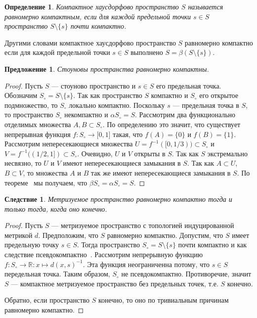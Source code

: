 \documentclass[12pt]{article}
\newtheorem{proposition}[theorem]{Предложение}
\newtheorem{corollary}[theorem]{Следствие}
\newtheorem{definition}[theorem]{Определение}
\begin{document}
\begin{definition} Компактное хаусдорфово пространство $S$ называется равномерно
    компактным, если для каждой предельной точки $s\in S$ пространство
    $S\setminus \{s\}$ почти компактно.
\end{definition}

Другими словами компактное хаусдорфово пространство $S$ равномерно компактно
если для каждой предельной точки $s\in S$ выполнено $S=\beta(S\setminus \{s\})$.

\begin{proposition}\label{StoneSpUnifComp} Стоуновы пространства равномерно
    компактны.
\end{proposition}
\begin{proof} Пусть $S$ --- стоуново пространство и $s\in S$ его предельная
    точка. Обозначим $S_\circ=S\setminus \{s\}$. Так как пространство $S$
    компактно и $S_\circ$ его открытое подмножество, то $S_\circ$ локально
    компактно. Поскольку $s$ --- предельная точка в $S$, то пространство
    $S_\circ$ некомпактно и $\alpha S_\circ=S$. Рассмотрим два функционально
    отделимых множества $A,B\subset S_\circ$. По определению это значит, что
    существует непрерывная функция $f:S_\circ\to\mathbb[0,1]$ такая, что
    $f(A)=\{0\}$ и $f(B)=\{1\}$. Рассмотрим непересекающиеся множества
    $U=f^{-1}([0,1/3))\subset S_\circ$ %
    и $V=f^{-1}((1/2,1])\subset S_\circ$. %
    Очевидно, $U$ и $V$ открыты в $S$. Так как $S$ экстремально несвязно, то $U$
    и $V$ имеют непересекающиеся замыкания в $S$. Так как $A\subset U$,
    $B\subset V$,  то множества $A$ и $B$ так же имеют непересекающиеся
    замыкания в $S$. По теореме~\cite[теорема 3.6.2]{EngkingGenTop} мы получаем,
    что $\beta S_\circ=\alpha S_\circ=S$.
\end{proof}

\begin{corollary}\label{MesSpUnifCompIffFin} Метризуемое пространство равномерно
    компактно тогда и только тогда, когда оно конечно.
\end{corollary}
\begin{proof} Пусть $S$ --- метризуемое пространство с топологией индуцированной
    метрикой $d$. Предположим, что $S$ равномерно компактно. Допустим, что $S$
    имеет предельную точку $s\in S$. Тогда пространство $S_\circ= S\setminus
        \{s\}$ почти компактно и как следствие псевдокомпактно~\cite[предложение
        1.3.10]{HrusPsdCompTopSp}. Рассмотрим непрерывную функцию
    $f:S_\circ\to\mathbb{R}:x\mapsto {d(x,s)}^{-1}$. Эта функция неограниченна
    потому, что $s\in S$ передельная точка. Таким образом, $S_\circ$ не
    псевдокомпактно. Противоречие, значит $S$ --- компактное метризуемое
    пространство без предельных точек, т.е. $S$ конечно.

    Обратно, если пространство $S$ конечно, то оно по тривиальным причинам
    равномерно компактно.
\end{proof}
\end{document}
